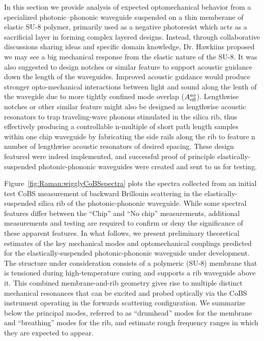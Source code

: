 In this section we provide analysis of expected optomechanical behavior from a specialized photonic--phononic waveguide suspended on a thin memberane of elastic SU-8 polymer, primarily used as a negative photoresist which acts as a sacrificial layer in forming complex layered designs. Instead, through collaborative discussions sharing ideas and specific domain knowledge, Dr. Hawkiins proposed we may see a big mechanical response from the elastic nature of the SU-8. It was also suggested to design notches or similar feature to support acoustic guidance down the length of the waveguides. Improved acoustic guidance would produce stronger opto-mechanical interactions between light and sound along the lenth of the wavegide due to more tightly confined mode overlap (\(A_{\rm eff}^{ao}\)). Lengthwise notches or other similar feature might also be designed as lengthwise acoustic resonators to trap traveling-wave phonons stimulated in the silica rib, thus effectively producing a controllable n-multiple of short path length samples within one chip waveguide by fabricating the side rails along the rib to feature n number of lengthwise acoustic resonators of desired spacing. These design featured were indeed implemented, and successful proof of principle elastically-suspended photonic-phononic waveguides were created and sent to us for testing.

Figure~\ref{fig:Raman:wigglyCoBSspectra} plots the spectra collected from an initial test \ac{CoBS} measurement of backward Brillouin scattering in the elastically-suspended silica rib of the photonic-phononic waveguide. While some spectral features differ between the ``Chip'' and ``No chip'' measurements, additional measurements and testing are required to confirm or deny the significance of these apparent features. In what follows, we present preliminary theoretical estimates of the key mechanical modes and optomechanical couplings predicted for the elastically-suspended photonic-phononic waveguide under development. The structure under consideration consists of a polymeric (SU-8) membrane that is tensioned during high-temperature curing and supports a rib waveguide above it. This combined membrane-and-rib geometry gives rise to multiple distinct mechanical resonances that can be excited and probed optically via the \ac{CoBS} instrument operating in the forwards scattering configuration. We summarize below the principal modes, referred to as ``drumhead'' modes for the membrane and ``breathing'' modes for the rib, and estimate rough frequency ranges in which they are expected to appear.

